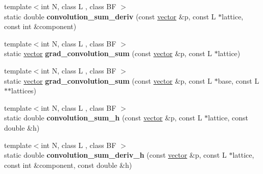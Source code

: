 \begin{DoxyCompactItemize}
\item 
\mbox{\label{classsisl_1_1zp3__element_ad7aa5ca329acb51e1b5f0416e2ef66f4}} 
{\footnotesize template$<$int N, class L , class BF $>$ }\\static double {\bfseries convolution\+\_\+sum\+\_\+deriv} (const \hyperlink{namespacesisl_a2069bd5374a9be042ff3ce3306d41e1a}{vector} \&p, const L $\ast$lattice, const int \&component)
\item 
\mbox{\label{classsisl_1_1zp3__element_ab58ef07abf797c578a37d3dfc9fa3273}} 
{\footnotesize template$<$int N, class L , class BF $>$ }\\static \hyperlink{namespacesisl_a2069bd5374a9be042ff3ce3306d41e1a}{vector} {\bfseries grad\+\_\+convolution\+\_\+sum} (const \hyperlink{namespacesisl_a2069bd5374a9be042ff3ce3306d41e1a}{vector} \&p, const L $\ast$lattice)
\item 
\mbox{\label{classsisl_1_1zp3__element_aa6703690d865d70809a46ea06e296ae7}} 
{\footnotesize template$<$int N, class L , class BF $>$ }\\static \hyperlink{namespacesisl_a2069bd5374a9be042ff3ce3306d41e1a}{vector} {\bfseries grad\+\_\+convolution\+\_\+sum} (const \hyperlink{namespacesisl_a2069bd5374a9be042ff3ce3306d41e1a}{vector} \&p, const L $\ast$base, const L $\ast$$\ast$lattices)
\item 
\mbox{\label{classsisl_1_1zp3__element_a35e259e74d2b0592eca4daff2bc4b34d}} 
{\footnotesize template$<$int N, class L , class BF $>$ }\\static double {\bfseries convolution\+\_\+sum\+\_\+h} (const \hyperlink{namespacesisl_a2069bd5374a9be042ff3ce3306d41e1a}{vector} \&p, const L $\ast$lattice, const double \&h)
\item 
\mbox{\label{classsisl_1_1zp3__element_af706e1413059b8e186f438d9f178c4ad}} 
{\footnotesize template$<$int N, class L , class BF $>$ }\\static double {\bfseries convolution\+\_\+sum\+\_\+deriv\+\_\+h} (const \hyperlink{namespacesisl_a2069bd5374a9be042ff3ce3306d41e1a}{vector} \&p, const L $\ast$lattice, const int \&component, const double \&h)
\item 
\mbox{\label{classsisl_1_1zp3__element_a61099f705bd717bd280ffaed1c68e202}} 
$$
\end{DoxyCompactItemize}
